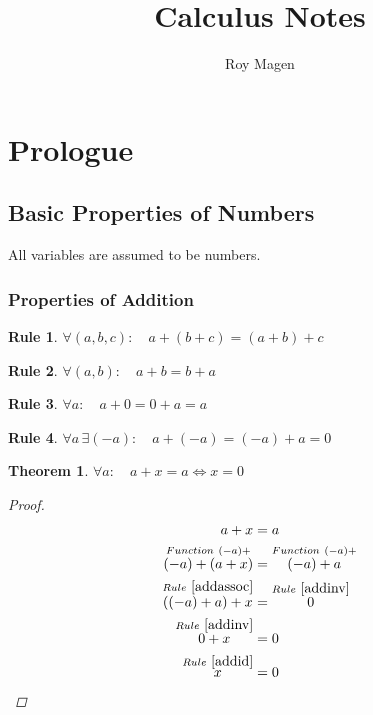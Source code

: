 \documentclass{article}
\title{Calculus Notes}
\author{Roy Magen}
\date{ }
\numberwithin{equation}{subsubsection}
\newtheorem{lrule}{Rule}
\newtheorem{thm}{Theorem}
\newcommand{\from}[3]{\overset{#1~#2}{#3}}
\begin{document}
\section{Prologue}
    \subsection{Basic Properties of Numbers}
    \newcommand{\nums}{\{\text{ numbers }\}}
    All variables are assumed to be numbers.
	\subsubsection{Properties of Addition}
	    \begin{lrule}\label{addassoc} $ \forall (a,b,c) : \quad a + (b + c) = (a + b) + c $ \end{lrule}
	    \begin{lrule}\label{addcomm} $ \forall (a,b) : \quad a + b = b + a $ \end{lrule}
	    \begin{lrule}\label{addid} $ \forall a : \quad a + 0 = 0 + a = a $ \end{lrule}
	    \begin{lrule}\label{addinv} $ \forall a \,\exists (-a) : \quad a + (-a) = (-a) + a = 0 $ \end{lrule}

	    \begin{thm}
		$ \forall a : \quad a + x = a \iff x = 0 $
		\begin{proof}
		    \begin{align}
			a + x &= a \\
			\from{Function}{(-a) +}{(-a) + (a + x)} &= \from{Function}{(-a) +}{(-a) + a} \\
			\from{Rule}{\ref{addassoc}}{((-a) + a) + x} &= \from{Rule}{\ref{addinv}}{0} \\
			\from{Rule}{\ref{addinv}}{0 + x} &= 0 \\
			\from{Rule}{\ref{addid}}{x} &= 0
		    \end{align}
		\end{proof}
	    \end{thm}
\end{document}
